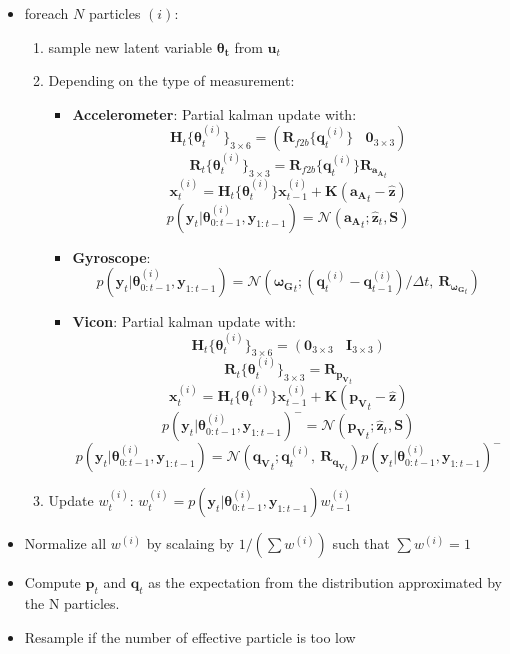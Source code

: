 \documentclass[]{article}
\providecommand{\tightlist}{%
  \setlength{\itemsep}{0pt}\setlength{\parskip}{0pt}}
\begin{document}
\begin{itemize}
\tightlist
\item
  foreach \(N\) particles \((i)\):

  \begin{enumerate}
  \def\labelenumi{\arabic{enumi}.}
  \tightlist
  \item
    sample new latent variable \(\boldsymbol{\theta_t}\) from
    \(\mathbf{u}_t\)
  \item
    Depending on the type of measurement:

    \begin{itemize}
    \tightlist
    \item
      \textbf{Accelerometer}: Partial kalman update with:
      \[\mathbf{H}_t\{\boldsymbol{\theta}^{(i)}_t\}_{3 \times 6} = (\mathbf{R}_{f2b}\{\mathbf{q}^{(i)}_{t}\} ~~~~ \mathbf{0}_{3 \times 3})\]
      \[\mathbf{R}_t\{\boldsymbol{\theta}^{(i)}_t\}_{3 \times 3} = \mathbf{R}_{f2b}\{\mathbf{q}^{(i)}_{t}\}\mathbf{R}_{\mathbf{a_A}_t } \]
      \[\mathbf{x}^{(i)}_t = \mathbf{H}_t\{\boldsymbol{\theta}^{(i)}_t\} \mathbf{x}^{(i)}_{t-1} + \mathbf{K}(\mathbf{a_A}_t - \hat{\mathbf{z}})\]
      \[p(\mathbf{y}_t | \boldsymbol{\theta}^{(i)}_{0:t-1}, \mathbf{y}_{1:t-1}) = \mathcal{N}(\mathbf{a_A}_t; \hat{\mathbf{z}}_t, \mathbf{S})\]
    \item
      \textbf{Gyroscope}:
      \[p(\mathbf{y}_t | \boldsymbol{\theta}^{(i)}_{0:t-1}, \mathbf{y}_{1:t-1}) = \mathcal{N}(\mathbf{\boldsymbol{\omega}_G}_t; (\mathbf{q}^{(i)}_t - \mathbf{q}^{(i)}_{t-1})/\Delta t,~ \mathbf{R}_{\mathbf{\boldsymbol{\omega}_G}_t})\]
    \item
      \textbf{Vicon}: Partial kalman update with:
      \[\mathbf{H}_t\{\boldsymbol{\theta}^{(i)}_t\}_{3 \times 6} = (\mathbf{0}_{3 \times 3} ~~~~ \mathbf{I}_{3 \times 3} )\]
      \[\mathbf{R}_t\{\boldsymbol{\theta}^{(i)}_t\}_{3 \times 3} =  \mathbf{R}_{\mathbf{p_V}_t }\]
      \[\mathbf{x}^{(i)}_t = \mathbf{H}_t\{\boldsymbol{\theta}^{(i)}_t\} \mathbf{x}^{(i)}_{t-1} + \mathbf{K}(\mathbf{p_V}_t - \hat{\mathbf{z}})\]
      \[p(\mathbf{y}_t | \boldsymbol{\theta}^{(i)}_{0:t-1}, \mathbf{y}_{1:t-1})^- = \mathcal{N}(\mathbf{p_V}_t; \hat{\mathbf{z}}_t, \mathbf{S})\]
      \[p(\mathbf{y}_t | \boldsymbol{\theta}^{(i)}_{0:t-1}, \mathbf{y}_{1:t-1}) = \mathcal{N}(\mathbf{q_V}_t; \mathbf{q}^{(i)}_t,~ \mathbf{R}_{\mathbf{q_V}_t }) p(\mathbf{y}_t | \boldsymbol{\theta}^{(i)}_{0:t-1}, \mathbf{y}_{1:t-1})^-\]
    \end{itemize}
  \item
    Update \(w^{(i)}_t\):
    \(w^{(i)}_t = p(\mathbf{y}_t | \boldsymbol{\theta}^{(i)}_{0:t-1}, \mathbf{y}_{1:t-1}) w^{(i)}_{t-1}\)\\
  \end{enumerate}
\item
  Normalize all \(w^{(i)}\) by scalaing by \(1/(\sum w^{(i)})\) such
  that \(\sum w^{(i)}= 1\)
\item
  Compute \(\mathbf{p}_t\) and \(\mathbf{q}_t\) as the expectation from
  the distribution approximated by the N particles.
\item
  Resample if the number of effective particle is too low
\end{itemize}
\end{document}

